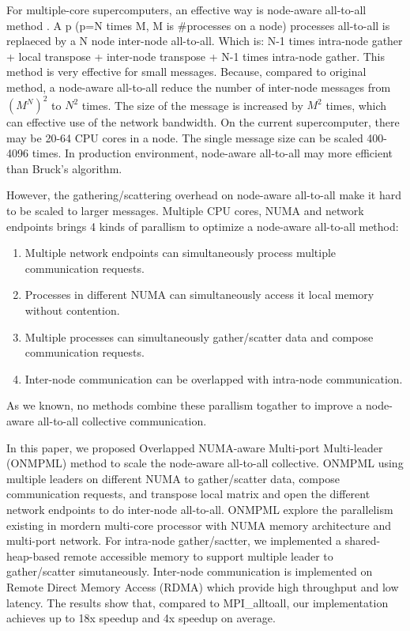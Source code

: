 For multiple-core supercomputers, an effective way is node-aware all-to-all method \cite{sistare1999optimization}.
A p (p=N times M, M is \#processes on a node) processes all-to-all is replaeced by a N node inter-node all-to-all. Which is: N-1 times intra-node gather + local transpose + inter-node transpose + N-1 times intra-node gather.
This method is very effective for small messages.
Because, compared to original method, a node-aware all-to-all reduce the number of inter-node messages from $(M^N)^2$ to $N^2$ times.
The size of the message is increased by $M^2$ times, which can effective use of the network bandwidth.
On the current supercomputer, there may be 20-64 CPU cores in a node.
The single message size can be scaled 400-4096 times.
In production environment, node-aware all-to-all may more efficient than Bruck's algorithm.


However, the gathering/scattering overhead on node-aware all-to-all make it hard to be scaled to larger messages.
Multiple CPU cores, NUMA and network endpoints brings 4 kinds of parallism to optimize a node-aware all-to-all method:
\begin{enumerate}[(1)]
\item Multiple network endpoints can simultaneously process multiple communication requests.
\item Processes in different NUMA can simultaneously access it local memory without contention.
\item Multiple processes can simultaneously gather/scatter data and compose communication requests.
\item Inter-node communication can be overlapped with intra-node communication.
\end{enumerate}
As we known, no methods combine these parallism togather to improve a node-aware all-to-all collective communication. 


In this paper, we proposed Overlapped NUMA-aware Multi-port Multi-leader (ONMPML) method to scale the node-aware all-to-all collective.
ONMPML using multiple leaders on different NUMA to gather/scatter data, compose communication requests, and transpose local matrix and open the different network endpoints to do inter-node all-to-all.
ONMPML explore the parallelism existing in mordern multi-core processor with NUMA memory architecture and multi-port network.
For intra-node gather/sactter, we implemented a shared-heap-based remote accessible memory to support multiple leader to gather/scatter simutaneously.
Inter-node communication is implemented on Remote Direct Memory Access (RDMA) which provide high throughput and low latency.
The results show that, compared to MPI\_alltoall, our implementation achieves up to 18x speedup and 4x speedup on average. 